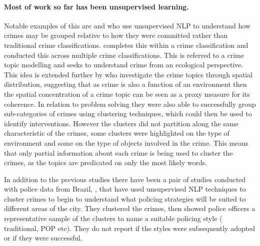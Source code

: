 \paragraph{Most of work so far has been unsupervised learning.} Notable examples of this are \textcite{birks2020unsupervised} and \textcite{kuang2017crime} who use unsupervised NLP to understand how crimes may be grouped relative to how they were committed rather than traditional crime classifications. \textcite{birks2020unsupervised} completes this within a crime classification and \textcite{kuang2017crime} conducted this across multiple crime classifications. This is referred to a crime topic modelling and seeks to understand crime from an ecological perspective. This idea is extended further by \textcite{Pandey201876} who investigate the crime topics through spatial distribution, suggesting that as crime is also a function of an environment then the spatial concentration of a crime topic can be seen as a proxy measure for its coherence. In relation to problem solving they were also able to successfully group sub-categories of crimes using clustering techniques, which could then be used to identify interventions. However the clusters did not partition along the same characteristic of the crimes, some clusters were highlighted on the type of environment and some on the type of objects involved in the crime. This means that only partial information about each crime is being used to cluster the crimes, as the topics are predicated on only the most likely words. 

In addition to the previous studies there have been a pair of studies conducted with police data from Brazil, \parencite{Basilio2020849, Basilio2019333}, that have used unsupervised NLP techniques to cluster crimes to begin to understand what policing strategies will be suited to different areas of the city. They clustered the crimes, then showed police officers a representative sample of the clusters to name a suitable policing style ( traditional, POP etc). They do not report if the styles were subsequently adopted or if they were successful.

